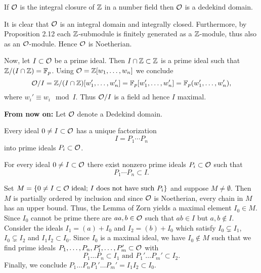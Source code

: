 \begin{Prop}
	If $\mathcal{O}$ is the integral closure of $\mathbb{Z}$ in a number field then $\mathcal{O}$ is a dedekind domain.
\end{Prop}


\begin{Bew}
	It is clear that $\mathcal{O}$ is an integral domain and integrally closed.
	Furthermore, by Proposition 2.12 each $\mathbb{Z}$-submodule is finitely generated as a $\mathbb{Z}$-module, thus also as an $\mathcal{O}$-module. Hence $\mathcal{O}$ is Noetherian.
	
	Now, let $I \subset \mathcal{O}$ be a prime ideal. Then $I \cap \mathbb{Z} \subset \mathbb{Z}$ is a prime ideal such that $\mathbb{Z}/(I\cap \mathbb{Z}) =\mathbb{F}_p$.
	Using $\mathcal{O}= \mathbb{Z}[w_1,\dots, w_n]$ we conclude
	\[ \mathcal{O}/ I = \mathbb{Z}/(I\cap \mathbb{Z}) [w_1', \dots, w_n'] 
	= \mathbb{F}_p [w_1', \dots, w_n'] 
	= \mathbb{F}_p (w_1', \dots, w_n'),
	\]
	where $w_i' \equiv w_i \mod I$. Thus $\mathcal{O}/ I$ is a field ad hence $I$ maximal.
\end{Bew}

\textbf{From now on:} Let $\mathcal{O}$ denote a Dedekind domain.

\begin{Satz}
	Every ideal $0 \neq I \subset \mathcal{O}$ has a unique factorization
	\[ I = P_1 \cdots P_n
	\]
	into prime ideals $P_i \subset \mathcal{O}$.
\end{Satz}

\begin{Lem}
	For every ideal $0\neq I \subset \mathcal{O}$ there exist nonzero prime ideals $P_i \subset \mathcal{O}$ such that
	\[ P_1 \cdots P_n \subset I.
	\]
\end{Lem}

\begin{Bew}Set $M = \{ 0 \neq I \subset \mathcal{O} \text{ ideal; } I \text{ does not have such } P_i \}$ and suppose $M \neq \emptyset$. Then $M$ is partially ordered by inclusion and since $\mathcal{O}$ is Noetherian, every chain in $M$ has an upper bound.
	Thus, the Lemma of Zorn yields a maximal element $I_0 \in M$. Since $I_0$ cannot be prime there are $aa,b \in \mathcal{O}$ such that $ab \in I$ but $a,b \not \in I$.
	Consider the ideals $I_1 = (a) +I_0$ and $I_2 =(b) + I_0$ which satisfy $I_0 \subsetneq I_1$, $I_0 \subsetneq I_2$ and $I_1I_2 \subset I_0$.
	Since $I_0$ is a maximal ideal, we have $I_0 \not \in M$ such that we find 
	prime ideals $P_1, \dots, P_n, P_1', \dots, P_m' \subset \mathcal{O}$ with
	\[ P_1 \dots P_n \subset I_1 \text{ and } P_1' \dots P_m' \subset I_2.
	\]
	Finally, we conclude $  P_1 \dots P_nP_1' \dots P_m' = I_1I_2 \subset I_0$.
\end{Bew}

